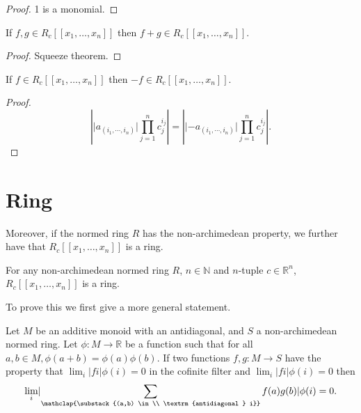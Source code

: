 \begin{proof}
  1 is a monomial.
\end{proof}

\begin{lemma}
  \label{add}
  \leanok
  If $f, g \in R_c [ \! [ x_1, \dots, x_n ] \! ]$ then $f+g \in R_c [ \! [ x_1, \dots, x_n ] \! ]$.
\end{lemma}

\begin{proof}
  Squeeze theorem.
\end{proof}

\begin{lemma}
  \label{neg}
  \leanok
  If $f \in R_c [ \! [ x_1, \dots, x_n ] \! ]$ then $-f \in R_c [ \! [ x_1, \dots, x_n ] \! ]$.
\end{lemma}

\begin{proof}
  \[
    \left \lvert \lvert a_{(i_1, \cdots, i_n)} \rvert \prod_{j=1}^{n} c_j^{i_j} \right \rvert =
    \left \lvert \lvert - a_{(i_1, \cdots, i_n)} \rvert \prod_{j=1}^{n} c_j^{i_j} \right \rvert.
  \]
\end{proof}

\section{Ring}

Moreover, if the normed ring $R$ has the non-archimedean property, we further have that
$R_c [ \! [ x_1, \dots, x_n ] \! ]$ is a ring.

\begin{theorem}
  For any non-archimedean normed ring $R$, $n \in \mathbb{N}$ and $n$-tuple $c \in \mathbb{R}^n$,
  $R_c [ \! [ x_1, \dots, x_n ] \! ]$ is a ring.
\end{theorem}

To prove this we first give a more general statement.

\begin{lemma}
  \label{tendsto_antidiagonal}
  \leanok
  Let $M$ be an additive monoid with an antidiagonal, and $S$ a non-archimedean normed ring. Let
  $\phi : M \to \mathbb{R}$ be a function such that for all $a, b \in M, \phi(a + b) = \phi(a)
  \phi(b)$. If two functions $f, g : M \to S$ have the property that
  $\lim_i \lvert f i \rvert \phi (i) = 0$ in the cofinite filter and
  $\lim_i \lvert f i \rvert \phi (i) = 0$ then
  \[
  \lim_i \lvert \sum_{\mathclap{\substack{(a,b) \in \\ \textrm{antidiagonal } i}}} f(a) g(b) \rvert
  \phi(i) = 0.
  \]
\end{lemma}


